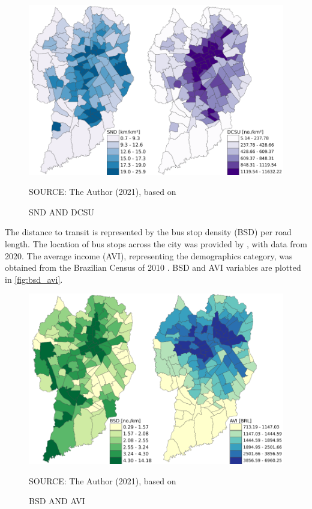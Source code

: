 \begin{figure}[!htbp]
    \centering\footnotesize
    \captionsetup{font=footnotesize}
    \caption{SND AND DCSU}
    \includegraphics{fig/map_SND+DCSU.pdf}
    \label{fig:snd_dcsu}
    \par SOURCE: The Author (2021), based on \textcite{IPPUC2018b,IPPUC2021}
\end{figure}

The distance to transit is represented by the bus stop density (BSD) per road length. The location of bus stops across the city was provided by \textcite{IPPUC2020a}, with data from 2020. The average income (AVI), representing the demographics category, was obtained from the Brazilian Census of 2010 \cite{IBGE2010}. BSD and AVI variables are plotted in \autoref{fig:bsd_avi}. 

\begin{figure}[!htbp]
    \centering\footnotesize
    \captionsetup{font=footnotesize}
    \caption{BSD AND AVI}
    \includegraphics{fig/map_BSD+AVI.pdf}
    \label{fig:bsd_avi}
    \par SOURCE: The Author (2021), based on \textcite{IPPUC2018b,IPPUC2020a, IBGE2010}
\end{figure}

